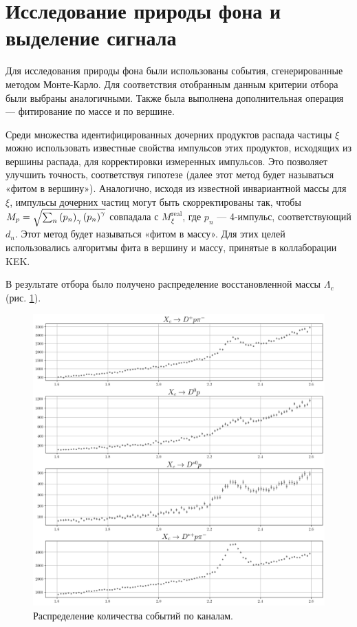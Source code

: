 \section{Исследование природы фона и выделение сигнала}

Для исследования природы фона были использованы события, сгенерированные методом Монте-Карло. Для соответствия отобранным данным критерии отбора были выбраны аналогичными. Также была выполнена дополнительная операция — фитирование по массе и по вершине.

Среди множества идентифицированных дочерних продуктов распада частицы $\xi$ можно использовать известные свойства импульсов этих продуктов, исходящих из вершины распада, для корректировки измеренных импульсов. Это позволяет улучшить точность, соответствуя гипотезе (далее этот метод будет называться «фитом в вершину»). Аналогично, исходя из известной инвариантной массы для $\xi$, импульсы дочерних частиц могут быть скорректированы так, чтобы $M_p = \sqrt{\sum_n \left( p_n \right)_\gamma \left( p_n \right)^\gamma}$ совпадала с $M^{\text{real}}_{\xi}$, где $p_n$ — 4-импульс, соответствующий $d_n$. Этот метод будет называться «фитом в массу». Для этих целей использовались алгоритмы фита в вершину и массу, принятые в коллаборации KEK.

В результате отбора было получено распределение восстановленной массы $\Lambda_c$ (рис. \ref{MC_inc_ful}).

\begin{figure}[H]
    \centering
    \includegraphics[width=1\linewidth]{img/MC_inc.png}
    \caption{Распределение количества событий по каналам.}
    \label{MC_inc_ful}
\end{figure}

